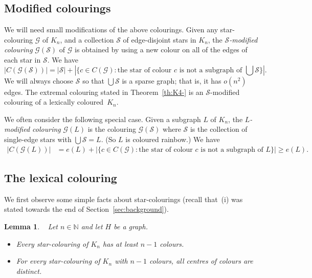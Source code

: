 \documentclass[a4paper, 12pt]{article}
\newcommand{\sG}{lexical }
\numberwithin{equation}{section}
\newtheorem{lemma}[theorem]{Lemma}
\newcommand{\mc}[1]{\mathcal{#1}}
\newcommand{\ms}[1]{\mathscr{#1}}
\begin{document}
\subsection{Modified colourings}

We will need small modifications of the above colourings.
Given any star-colouring $\ms{G}$ of $K_n$,
and a collection $\mc{S}$ of edge-disjoint stars in $K_n$, the \emph{$\mc{S}$-modified colouring} $\ms{G}(\mc{S})$ of $\ms{G}$ is obtained by using a new colour on all of the edges of each star in $\mc{S}$.
We have
\begin{equation}\label{eq:modified}
    |C(\ms{G}(\mc{S}))| = |\mc{S}| + |\{c \in C(\ms{G}): \text{the star of colour }c\text{ is not a subgraph of } \textstyle\bigcup \mc{S}\}|.
\end{equation}
We will always choose $\mc{S}$ so that $\bigcup\mc{S}$ is a sparse graph; that is, it has $o(n^2)$ edges.
The extremal colouring stated in Theorem~\ref{th:K4-} is an
$\mc{S}$-modified colouring of a lexically coloured~$K_n$. 

We often consider the following special case.
Given a subgraph $L$ of $K_n$, the \emph{$L$-modified colouring} $\ms{G}(L)$ is the colouring $\ms{G}(\mc{S})$ where $\mc{S}$ is the collection of single-edge stars with $\bigcup\mc{S}=L$.
(So $L$ is coloured rainbow.) We have
\begin{align}
    |C(\ms{G}(L))| &= e(L) + |\{c \in C(\ms{G}): \text{the star of colour }c\text{ is not a subgraph of } L\}| \geq e(L) \label{eq:modifiedL}.
\end{align}


\subsection{The lexical colouring}\label{sec:lex}

We first observe some simple facts about star-colourings (recall that~(i) was stated towards the end of  Section~\ref{sec:background}).

\begin{lemma}\label{lm:obs1}~
Let $n\in\mathbb N$ and let  $H$ be a graph. 
\begin{itemize}
    \item[\rm(i)] Every star-colouring of $K_n$ has at least $n-1$ colours.
    \item[\rm(ii)] For every star-colouring of $K_n$ with $n-1$ colours, all centres of colours are distinct.
    \end{itemize}
\end{lemma}
\end{document}
